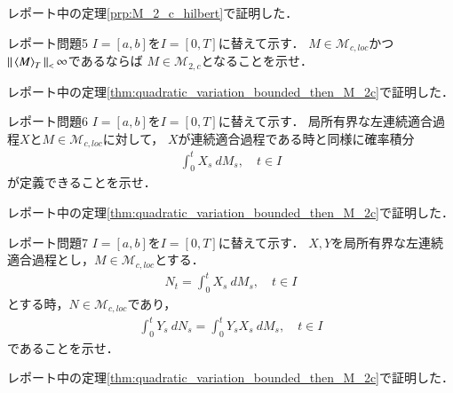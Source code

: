 \begin{prf}
	レポート中の定理\ref{prp:M_2_c_hilbert}で証明した．
	\QED
\end{prf}

\newpage
\begin{itembox}[l]{レポート問題5}
	$I = [a,b]$を$I = [0,T]$に替えて示す．
	$M \in \mathcal{M}_{c,loc}$かつ$\Norm{\inprod<M>_T} < \infty$であるならば
	$M \in \mathcal{M}_{2,c}$となることを示せ．
\end{itembox}

\begin{prf}
	レポート中の定理\ref{thm:quadratic_variation_bounded_then_M_2c}で証明した．
	\QED
\end{prf}

\newpage
\begin{itembox}[l]{レポート問題6}
	$I = [a,b]$を$I = [0,T]$に替えて示す．
	局所有界な左連続適合過程$X$と$M \in \mathcal{M}_{c,loc}$に対して，
	$X$が連続適合過程である時と同様に確率積分
	\begin{align}
		\int_0^t X_s\ dM_s,
		\quad t \in I
	\end{align}
	が定義できることを示せ．
\end{itembox}

\begin{prf}
	レポート中の定理\ref{thm:quadratic_variation_bounded_then_M_2c}で証明した．
	\QED
\end{prf}

\newpage
\begin{itembox}[l]{レポート問題7}
	$I = [a,b]$を$I = [0,T]$に替えて示す．
	$X,Y$を局所有界な左連続適合過程とし，$M \in \mathcal{M}_{c,loc}$とする．
	\begin{align}
		N_t = \int_0^t X_s\ dM_s,
		\quad t \in I
	\end{align}
	とする時，$N \in \mathcal{M}_{c,loc}$であり，
	\begin{align}
		\int_0^t Y_s\ dN_s = \int_0^t Y_s X_s\ dM_s,
		\quad t \in I
	\end{align}
	であることを示せ．
\end{itembox}

\begin{prf}
	レポート中の定理\ref{thm:quadratic_variation_bounded_then_M_2c}で証明した．
	\QED
\end{prf}
